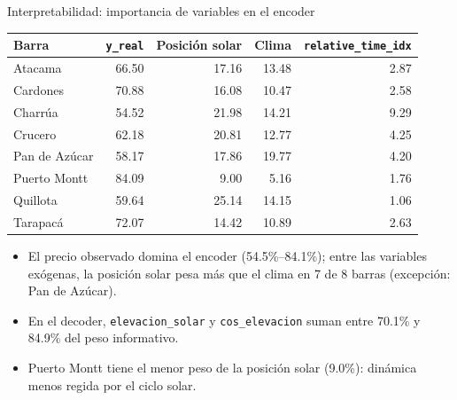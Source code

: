 \documentclass[aspectratio=169]{beamer}
\begin{document}
\begin{frame}{Interpretabilidad: importancia de variables en el encoder}
    \begin{table}
        \centering
        \scriptsize
        \begin{tabular}{lrrrr}
            \toprule
            Barra & \texttt{y\_real} & Posición solar & Clima & \texttt{relative\_time\_idx} \\
            \midrule
            Atacama       & 66.50 & 17.16 & 13.48 & 2.87 \\
            Cardones      & 70.88 & 16.08 & 10.47 & 2.58 \\
            Charrúa       & 54.52 & 21.98 & 14.21 & 9.29 \\
            Crucero       & 62.18 & 20.81 & 12.77 & 4.25 \\
            Pan de Azúcar & 58.17 & 17.86 & 19.77 & 4.20 \\
            Puerto Montt  & 84.09 &  9.00 &  5.16 & 1.76 \\
            Quillota      & 59.64 & 25.14 & 14.15 & 1.06 \\
            Tarapacá      & 72.07 & 14.42 & 10.89 & 2.63 \\
            \bottomrule
        \end{tabular}
    \end{table}
    \begin{itemize}
        \item El precio observado domina el encoder (54.5\%--84.1\%); entre las variables exógenas, la posición solar pesa más que el clima en 7 de 8 barras (excepción: Pan de Azúcar).
        \item En el decoder, \texttt{elevacion\_solar} y \texttt{cos\_elevacion} suman entre 70.1\% y 84.9\% del peso informativo.
        \item Puerto Montt tiene el menor peso de la posición solar (9.0\%): dinámica menos regida por el ciclo solar.
    \end{itemize}
\end{frame}
\end{document}
